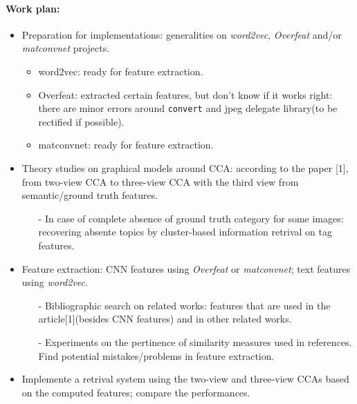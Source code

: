 \documentclass[12pt]{report}	%
\begin{document}
\paragraph{Work plan:} 
\begin{itemize}
\item Preparation for implementations: generalities on \textit{word2vec}, \textit{Overfeat} and/or \textit{matconvnet} projects.
\begin{itemize}
\item word2vec: ready for feature extraction.
\item Overfeat: extracted certain features, but don't know if it works right: there are minor errors around \texttt{convert} and jpeg delegate library(to be rectified if possible).
\item matconvnet: ready for feature extraction.
\end{itemize} 
\item Theory studies on graphical models around CCA: according to the paper [1], from two-view CCA to three-view CCA with the third view from semantic/ground truth features.

\begin{itemize}
\item[-] In case of complete absence of ground truth category for some images: recovering absente topics by cluster-based information retrival on tag features.
\end{itemize}
\item Feature extraction: CNN features using \textit{Overfeat} or \textit{matconvnet}; text features using \textit{word2vec}.
\begin{itemize}
\item[-] Bibliographic search on related works: features that are used in the article[1](besides CNN features) and in other related works.
\item[-] Experiments on the pertinence of similarity measures used in references. Find potential mistakes/problems in feature extraction.
\end{itemize}
\item Implemente a retrival system using the two-view and three-view CCAs based on the computed features; compare the performances. 

\end{itemize}
\end{document}
